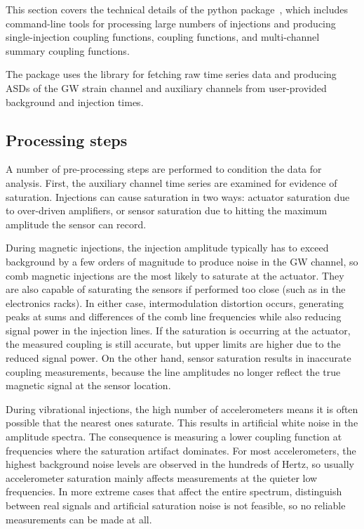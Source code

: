 This section covers the technical details of the \pemcoupling python package~\citep{pem_code}, which includes command-line tools for processing large numbers of injections and producing single-injection coupling functions, coupling functions, and multi-channel summary coupling functions.

The package uses the  library for fetching raw time series data and producing \acp{ASD} of the \ac{GW} strain channel and auxiliary channels from user-provided background and injection times.

\subsection{Processing steps}

A number of pre-processing steps are performed to condition the data for analysis.
First, the auxiliary channel time series are examined for evidence of saturation.
Injections can cause saturation in two ways: actuator saturation due to over-driven amplifiers, or sensor saturation due to hitting the maximum amplitude the sensor can record.

During magnetic injections, the injection amplitude typically has to exceed background by a few orders of magnitude to produce noise in the \ac{GW} channel, so comb magnetic injections are the most likely to saturate at the actuator.
They are also capable of saturating the sensors if performed too close (such as in the electronics racks).
In either case, intermodulation distortion occurs, generating peaks at sums and differences of the comb line frequencies while also reducing signal power in the injection lines.
If the saturation is occurring at the actuator, the measured coupling is still accurate, but upper limits are higher due to the reduced signal power.
On the other hand, sensor saturation results in inaccurate coupling measurements, because the line amplitudes no longer reflect the true magnetic signal at the sensor location.

During vibrational injections, the high number of accelerometers means it is often possible that the nearest ones saturate.
This results in artificial white noise in the amplitude spectra.
The consequence is measuring a lower coupling function at frequencies where the saturation artifact dominates.
For most accelerometers, the highest background noise levels are observed in the hundreds of Hertz, so usually accelerometer saturation mainly affects measurements at the quieter low frequencies.
In more extreme cases that affect the entire spectrum, distinguish between real signals and artificial saturation noise is not feasible, so no reliable measurements can be made at all.

